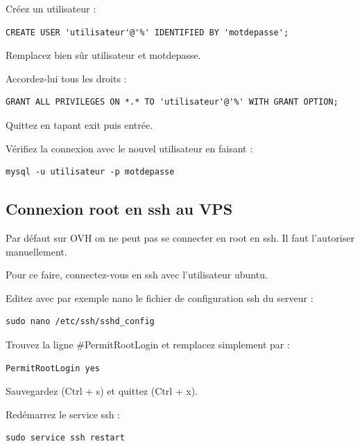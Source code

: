 \documentclass{article}
\begin{document}
Créez un utilisateur :
\begin{verbatim}
CREATE USER 'utilisateur'@'%' IDENTIFIED BY 'motdepasse';
\end{verbatim}

Remplacez bien sûr utilisateur et motdepasse.

Accordez-lui tous les droits :
\begin{verbatim}
GRANT ALL PRIVILEGES ON *.* TO 'utilisateur'@'%' WITH GRANT OPTION;
\end{verbatim}

Quittez en tapant exit puis entrée.

Vérifiez la connexion avec le nouvel utilisateur en faisant :
\begin{verbatim}
mysql -u utilisateur -p motdepasse
\end{verbatim}

\subsection{Connexion root en ssh au VPS}
Par défaut sur OVH on ne peut pas se connecter en root en ssh. Il faut l'autoriser manuellement.

Pour ce faire, connectez-vous en ssh avec l'utilisateur ubuntu.

Editez avec par exemple nano le fichier de configuration ssh du serveur :
\begin{verbatim}
sudo nano /etc/ssh/sshd_config
\end{verbatim}

Trouvez la ligne \#PermitRootLogin et remplacez simplement par :
\begin{verbatim}
PermitRootLogin yes
\end{verbatim}

Sauvegardez (Ctrl + s) et quittez (Ctrl + x).

Redémarrez le service ssh :
\begin{verbatim}
sudo service ssh restart
\end{verbatim}
\end{document}
